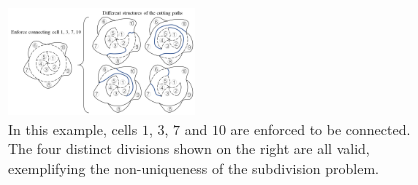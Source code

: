 \documentclass[Afour,sageh,times]{sagej}
\begin{document}

\begin{figure}[t]
\centering
\includegraphics[width = 0.44\textwidth]{figures/RSS_related_figures/proof/fig_only_one_division_3}
\caption{In this example, cells $1$, $3$, $7$ and $10$ are enforced to be connected.
The four distinct divisions shown on the right are all valid, exemplifying the non-uniqueness of the subdivision problem.
}\label{fig_not_same_cutting_path}
\end{figure}
\end{document}
